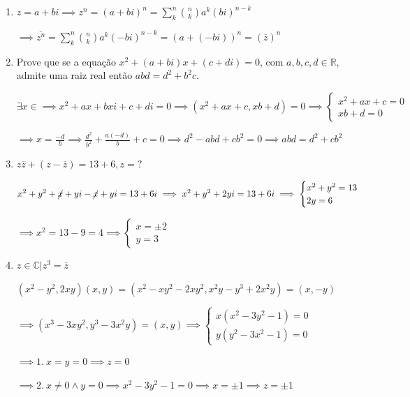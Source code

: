 \documentclass[12pt, openright, a4paper, twoside, english, brazil]{article}
\newenvironment{qitem}{
  \color{black}
\item}{\vspace{10pt}}
\begin{document}
\begin{enumerate}[\bfseries 1.]
\begin{qitem}
    \color{red}
    $\displaystyle z=a+bi\implies z^n=(a+bi)^n=\sum_k^n{n \choose
    k}a^k(bi)^{n-k}$

    $\displaystyle \implies \overline{z^n}=\sum_k^n{n \choose
    k}a^k(-bi)^{n-k}=(a+(-bi))^n=(\overline{z})^n$
  \end{qitem}

  \begin{qitem} %
    Prove que se a equação $x^2+(a+bi)x+(c+di)=0$, com
    $a,b,c,d\in\mathbb R$, admite uma raiz real então $abd=d^2+b^2c$.

    \color{red}
    $\exists x\in\mathbb\implies x^2+ax+bxi+c+di=0\implies
    (x^2+ax+c,xb+d)=0\implies
    \begin{cases}x^2+ax+c=0\\xb+d=0
    \end{cases}$

    $\displaystyle \implies x=\frac{-d}{b}\implies
    \frac{d^2}{b^2}+\frac{a(-d)}{b}+c=0\implies
    d^2-abd+cb^2=0\implies abd=d^2+cb^2$
  \end{qitem}

  \begin{qitem} %
    $z\overline z+(z-\overline z)=13+6, z=?$

    \color{red}
    $x^2+y^2+\cancel{x}+yi-\cancel{x}+yi=13+6i\implies x^2+y^2+2yi=13+6i\implies
    \begin{cases}x^2+y^2=13\\2y=6
    \end{cases}$

    $\implies x^2=13-9=4\implies
    \begin{cases}x=\pm 2\\y=3
    \end{cases}$
  \end{qitem}

  \begin{qitem} %
    $z\in\mathbb C|z^3=\overline z$

    \color{red}
    $(x^2-y^2,2xy)(x,y)=(x^2-xy^2-2xy^2,x^2y-y^3+2x^2y)=(x,-y)$

    $\implies(x^3-3xy^2,y^3-3x^2y)=(x,y)\implies
    \begin{cases}x(x^2-3y^2-1)=0\\y(y^2-3x^2-1)=0
    \end{cases}$

    $\implies 1. \ x=y=0\implies z=0$

    $\implies 2. \ x\ne 0\wedge y= 0\implies x^2-3y^2-1=0\implies
    x=\pm 1\implies z=\pm 1$


\end{qitem}
\end{enumerate}
\end{document}

